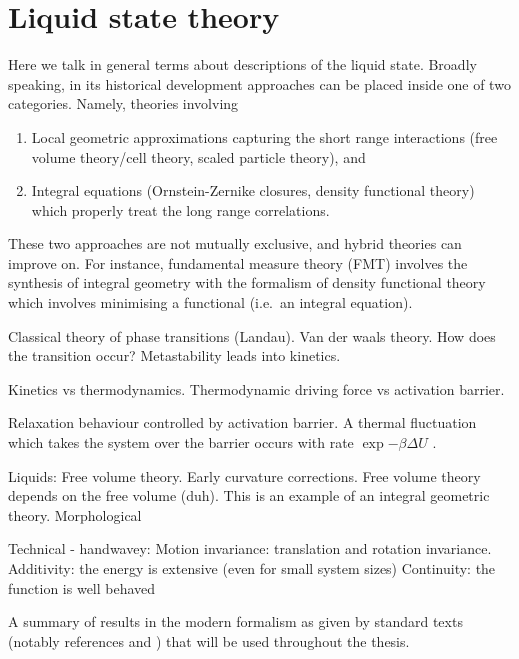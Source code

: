 \section{Liquid state theory}

Here we talk in general terms about descriptions of the liquid state.
Broadly speaking, in its historical development approaches can be placed inside one of two categories.
Namely, theories involving
\begin{enumerate}
  \item Local geometric approximations capturing the short range interactions (free volume theory/cell theory, scaled particle theory), and
  \item Integral equations (Ornstein-Zernike closures, density functional theory) which properly treat the long range correlations.
\end{enumerate}
These two approaches are not mutually exclusive, and hybrid theories can improve on.
For instance, fundamental measure theory (FMT) involves the synthesis of integral geometry with the formalism of density functional theory which involves minimising a functional (i.e.\ an integral equation).

Classical theory of phase transitions (Landau).
Van der waals theory.
How does the transition occur?
Metastability leads into kinetics.

Kinetics vs thermodynamics.
Thermodynamic driving force vs activation barrier.

Relaxation behaviour controlled by activation barrier.
A thermal fluctuation which takes the system over the barrier%
occurs with rate $\exp{-\beta \Delta U}$ \cite{Langer}.

Liquids:
Free volume theory.
Early curvature corrections.
Free volume theory depends on the free volume (duh).
This is an example of an integral geometric theory.
Morphological 

Technical - handwavey:
Motion invariance: translation and rotation invariance.
Additivity: the energy is extensive (even for small system sizes)
Continuity: the function is well behaved

A summary of results in the modern formalism as given by standard texts (notably references \cite{Hansen2013} and \cite{Santos2016}) that will be used throughout the thesis.

